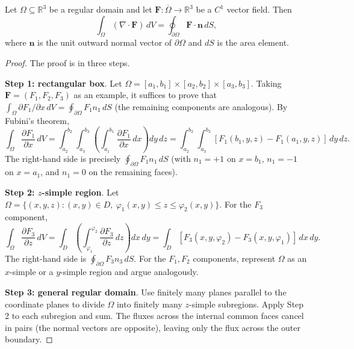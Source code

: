 \begin{theorem}\label{thm:gauss_regularity}
Let $\Omega \subseteq \mathbb{R}^3$ be a regular domain and let $\mathbf{F}: \overline{\Omega} \to \mathbb{R}^3$ be a $C^1$ vector field. Then
\[
\int_\Omega (\nabla \cdot \mathbf{F}) \, dV = \oint_{\partial \Omega} \mathbf{F} \cdot \mathbf{n} \, dS,
\]
where $\mathbf{n}$ is the unit outward normal vector of $\partial \Omega$ and $dS$ is the area element.
\end{theorem}

\begin{proof}
The proof is in three steps.

\textbf{Step 1: rectangular box}. Let $\Omega = [a_1, b_1] \times [a_2, b_2] \times [a_3, b_3]$. Taking $\mathbf{F} = (F_1, F_2, F_3)$ as an example, it suffices to prove that $\int_\Omega \partial F_1/\partial x \, dV = \oint_{\partial \Omega} F_1 n_1 \, dS$ (the remaining components are analogous). By Fubini's theorem,
\[
\int_\Omega \frac{\partial F_1}{\partial x} \, dV = \int_{a_2}^{b_2} \int_{a_3}^{b_3} \left( \int_{a_1}^{b_1} \frac{\partial F_1}{\partial x} \, dx \right) dy \, dz = \int_{a_2}^{b_2} \int_{a_3}^{b_3} [F_1(b_1, y, z) - F_1(a_1, y, z)] \, dy \, dz.
\]
The right-hand side is precisely $\oint_{\partial \Omega} F_1 n_1 \, dS$ (with $n_1 = +1$ on $x = b_1$, $n_1 = -1$ on $x = a_1$, and $n_1 = 0$ on the remaining faces).

\textbf{Step 2: $z$-simple region}. Let $\Omega = \{(x, y, z) : (x, y) \in D,\ \varphi_1(x, y) \le z \le \varphi_2(x, y)\}$. For the $F_3$ component,
\[
\int_\Omega \frac{\partial F_3}{\partial z} \, dV = \int_D \left( \int_{\varphi_1}^{\varphi_2} \frac{\partial F_3}{\partial z} \, dz \right) dx \, dy = \int_D [F_3(x, y, \varphi_2) - F_3(x, y, \varphi_1)] \, dx \, dy.
\]
The right-hand side is $\oint_{\partial \Omega} F_3 n_3 \, dS$. For the $F_1, F_2$ components, represent $\Omega$ as an $x$-simple or a $y$-simple region and argue analogously.

\textbf{Step 3: general regular domain}. Use finitely many planes parallel to the coordinate planes to divide $\Omega$ into finitely many $z$-simple subregions. Apply Step 2 to each subregion and sum. The fluxes across the internal common faces cancel in pairs (the normal vectors are opposite), leaving only the flux across the outer boundary.
\end{proof}

